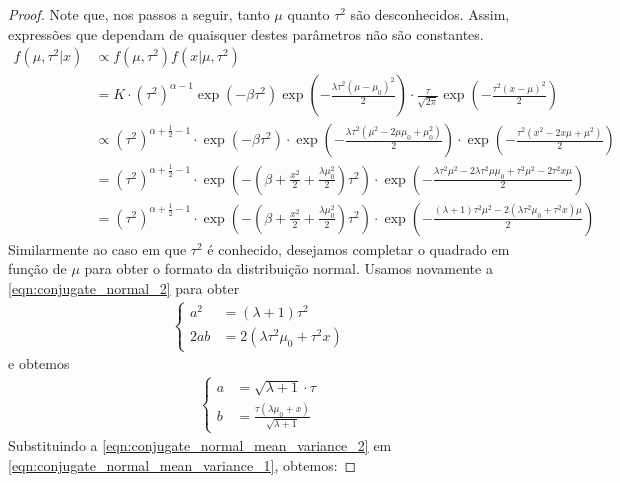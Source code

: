 \begin{proof}
 Note que, nos passos a seguir, tanto
 $\mu$ quanto $\tau^{2}$ são desconhecidos.
 Assim, expressões que dependam de
 quaisquer destes parâmetros não são constantes.
 \begin{align}
  \label{eqn:conjugate_normal_mean_variance_1}
  f(\mu,\tau^{2}|x)
  &\propto f(\mu,\tau^{2})f(x|\mu,\tau^{2})	\nonumber \\
  &= K \cdot (\tau^{2})^{\alpha-1}\exp(-\beta \tau^{2})\exp\left(-\frac{\lambda\tau^{2}(\mu-\mu_{0})^{2}}{2}\right) \cdot \frac{\tau}{\sqrt{2\pi}}\exp\left(-\frac{\tau^{2}(x-\mu)^{2}}{2}\right) \nonumber \\
  &\propto (\tau^{2})^{\alpha+\frac{1}{2}-1} \cdot \exp(-\beta \tau^{2}) \cdot \exp\left(-\frac{\lambda\tau^{2}(\mu^{2}-2\mu\mu_{0}+\mu_{0}^{2})}{2}\right) \cdot \exp\left(-\frac{\tau^{2}(x^{2}-2x\mu+\mu^{2})}{2}\right)	\nonumber \\
  &= (\tau^{2})^{\alpha+\frac{1}{2}-1} \cdot \exp\left(-\left(\beta + \frac{x^{2}}{2} + \frac{\lambda\mu_{0}^{2}}{2}\right)\tau^{2}\right) \cdot \exp\left(-\frac{\lambda\tau^{2}\mu^{2}-2\lambda\tau^{2}\mu\mu_{0}+\tau^{2}\mu^{2}-2\tau^{2}x\mu}{2}\right) \nonumber \\
  &= (\tau^{2})^{\alpha+\frac{1}{2}-1} \cdot \exp\left(-\left(\beta + \frac{x^{2}}{2} + \frac{\lambda\mu_{0}^{2}}{2}\right)\tau^{2}\right) \cdot \exp\left(-\frac{(\lambda+1)\tau^{2}\mu^{2}-2(\lambda\tau^{2}\mu_{0}+\tau^{2}x)\mu}{2}\right)
 \end{align}
 Similarmente ao caso em que $\tau^{2}$ é conhecido,
 desejamos completar o quadrado em função de
 $\mu$ para obter o formato da distribuição normal.
 Usamos novamente a \cref{eqn:conjugate_normal_2} para
 obter
 \begin{align*}
  \begin{cases}
   a^{2} &= (\lambda+1)\tau^{2} \\
   2ab &= 2(\lambda\tau^{2}\mu_{0}+\tau^{2}x)
  \end{cases}
 \end{align*}
 e obtemos
 \begin{align}
  \label{eqn:conjugate_normal_mean_variance_2}
  \begin{cases}
   a &= \sqrt{\lambda+1} \cdot \tau \\
   b &= \frac{\tau(\lambda\mu_{0}+x)}{\sqrt{\lambda+1}}
  \end{cases}
 \end{align}
 Substituindo a
 \cref{eqn:conjugate_normal_mean_variance_2}
 em \cref{eqn:conjugate_normal_mean_variance_1}, obtemos:

\end{proof}
